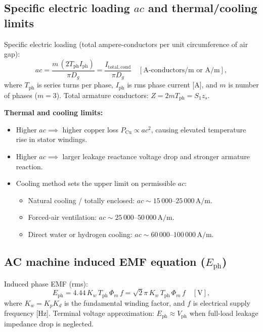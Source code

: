 \subsection{Specific electric loading $ac$ and thermal/cooling limits}
Specific electric loading (total ampere-conductors per unit circumference of air gap):
\[
\boxed{ac = \frac{m\,(2 T_{\mathrm{ph}} I_{\mathrm{ph}})}{\pi D_g} = \frac{I_{\mathrm{total,cond}}}{\pi D_g}}\quad[\mathrm{A\text{-}conductors/m}\text{ or }\mathrm{A/m}],
\]
where $T_{\mathrm{ph}}$ is series turns per phase, $I_{\mathrm{ph}}$ is rms phase current [A], and $m$ is number of phases ($m=3$).
Total armature conductors: $Z = 2 m T_{\mathrm{ph}} = S_1 z_s$.

\textbf{Thermal and cooling limits:}
\begin{itemize}
  \item Higher $ac \implies$ higher copper loss $P_{\mathrm{Cu}} \propto ac^2$, causing elevated temperature rise in stator windings.
  \item Higher $ac \implies$ larger leakage reactance voltage drop and stronger armature reaction.
  \item Cooling method sets the upper limit on permissible $ac$:
  \begin{itemize}
    \item Natural cooling / totally enclosed: $ac \sim 15\,000\text{--}25\,000\,\mathrm{A/m}$.
    \item Forced-air ventilation: $ac \sim 25\,000\text{--}50\,000\,\mathrm{A/m}$.
    \item Direct water or hydrogen cooling: $ac \sim 60\,000\text{--}100\,000\,\mathrm{A/m}$.
  \end{itemize}
\end{itemize}

\subsection{AC machine induced EMF equation ($E_{\mathrm{ph}}$)}
Induced phase EMF (rms):
\[
\boxed{E_{\mathrm{ph}} = 4.44\,K_w\,T_{\mathrm{ph}}\,\Phi_m\,f = \sqrt{2}\pi\,K_w\,T_{\mathrm{ph}}\,\Phi_m\,f}\quad[\mathrm{V}],
\]
where $K_w = K_p K_d$ is the fundamental winding factor, and $f$ is electrical supply frequency [Hz].
Terminal voltage approximation: $E_{\mathrm{ph}} \approx V_{\mathrm{ph}}$ when full-load leakage impedance drop is neglected.

